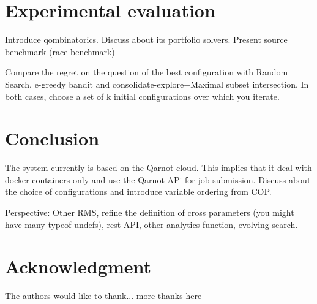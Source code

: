 \documentclass[10pt, conference, compsocconf]{IEEEtran}
\begin{document}
\section{Experimental evaluation} \label{Proof-of-concept}


Introduce qombinatorics. 
Discuss about its portfolio solvers. 
Present source benchmark (race benchmark)

Compare the regret on the question of the best configuration with Random Search, e-greedy bandit and consolidate-explore+Maximal 
subset intersection. In both cases, choose a set of k initial configurations over which you iterate.


\section{Conclusion} \label{Conclusion}


The system currently is based on the Qarnot cloud. This implies that it deal with docker containers only and 
use the Qarnot APi for job submission.
Discuss about the choice of configurations and introduce variable ordering from COP.

Perspective: Other RMS, refine the definition of cross parameters (you might have many typeof undefs), rest API, 
other analytics function, evolving search.





\section*{Acknowledgment}


The authors would like to thank...
more thanks here








\end{document}

